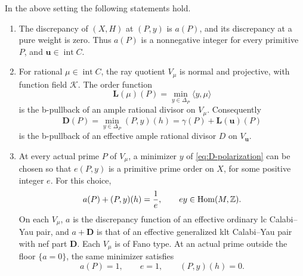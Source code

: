 \begin{proposition}\label{prop:D-cone-dictionary}
In the above setting the following statements hold.
\begin{enumerate}[label=\textup{(\roman*)}]
\item The discrepancy of $(X,H)$ at $(P,y)$ is $a(P)$, and its discrepancy
at a pure weight is zero.  Thus $a(P)$ is a nonnegative integer for every
primitive $P$, and $\mathbf u\in\operatorname{int}C$.
\item For rational $\mu\in\operatorname{int}C$, the ray quotient $V_\mu$ is
normal and projective, with function field $\mathcal K$.  The order function
\begin{equation}\label{eq:D-polarization}
 \mathbf L(\mu)(P)=\min_{y\in\Delta_P}\langle y,\mu\rangle
\end{equation}
is the b-pullback of an ample rational divisor on $V_\mu$.  Consequently
\begin{equation}\label{eq:D-height-divisor}
 \mathbf D(P)=\min_{y\in\Delta_P}(P,y)(h)
             =\gamma(P)+\mathbf L(\mathbf u)(P)
\end{equation}
is the b-pullback of an effective ample rational divisor $D$ on
$V_{\mathbf u}$.
\item At every actual prime $P$ of $V_\mu$, a minimizer $y$ of
\eqref{eq:D-polarization} can be chosen so that $e(P,y)$ is a primitive
prime order on $X$, for some positive integer $e$.  For this choice,
\begin{equation}\label{eq:D-actual-prime}
 a(P)+(P,y)(h)=\frac1e,
 \qquad e y\in\operatorname{Hom}(M,\mathbb Z).
\end{equation}
On each $V_\mu$, $a$ is the discrepancy function of an effective ordinary
lc Calabi--Yau pair, and $a+\mathbf D$ is that of an effective generalized
klt Calabi--Yau pair with nef part $\mathbf D$.  Each $V_\mu$ is of Fano
type.  At an actual prime outside the floor $\{a=0\}$, the same minimizer
satisfies
\begin{equation}\label{eq:D-off-floor}
 a(P)=1,\qquad e=1,\qquad (P,y)(h)=0.
\end{equation}
\end{enumerate}
\end{proposition}

